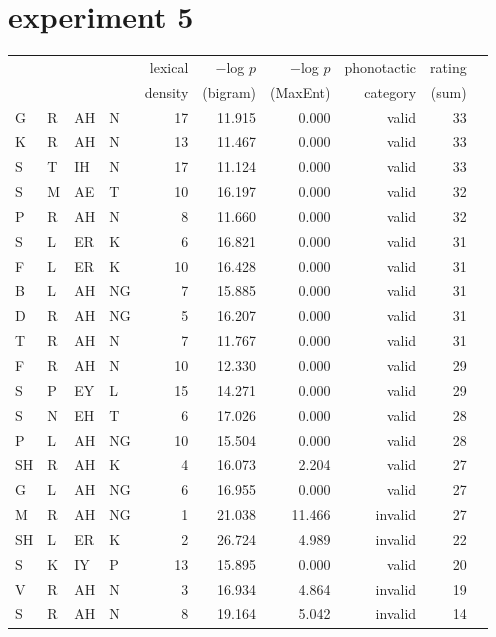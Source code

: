 \section{\citet{Scholes1966} experiment 5}    

\begin{longtable}{l@{ } l@{ } l@{ } l r r r r r r} 
\toprule
  &   &    &     & lexical & $-$log $p$ & $-$log $p$ & phonotactic & rating \\
&&&& density & (bigram) & (MaxEnt) & category & (sum) \\
\midrule 
G  & R  & AH & N  & 17 & 11.915 & 0.000  & valid   & 33 \\
K  & R  & AH & N  & 13 & 11.467 & 0.000  & valid   & 33 \\
S  & T  & IH & N  & 17 & 11.124 & 0.000  & valid   & 33 \\
S  & M  & AE & T  & 10 & 16.197 & 0.000  & valid   & 32 \\
P  & R  & AH & N  & 8  & 11.660 & 0.000  & valid   & 32 \\
S  & L  & ER & K  & 6  & 16.821 & 0.000  & valid   & 31 \\
F  & L  & ER & K  & 10 & 16.428 & 0.000  & valid   & 31 \\
B  & L  & AH & NG & 7  & 15.885 & 0.000  & valid   & 31 \\
D  & R  & AH & NG & 5  & 16.207 & 0.000  & valid   & 31 \\
T  & R  & AH & N  & 7  & 11.767 & 0.000  & valid   & 31 \\
F  & R  & AH & N  & 10 & 12.330 & 0.000  & valid   & 29 \\
S  & P  & EY & L  & 15 & 14.271 & 0.000  & valid   & 29 \\
S  & N  & EH & T  & 6  & 17.026 & 0.000  & valid   & 28 \\
P  & L  & AH & NG & 10 & 15.504 & 0.000  & valid   & 28 \\
SH & R  & AH & K  & 4  & 16.073 & 2.204  & valid   & 27 \\
G  & L  & AH & NG & 6  & 16.955 & 0.000  & valid   & 27 \\
M  & R  & AH & NG & 1  & 21.038 & 11.466 & invalid & 27 \\
SH & L  & ER & K  & 2  & 26.724 & 4.989  & invalid & 22 \\
S  & K  & IY & P  & 13 & 15.895 & 0.000  & valid   & 20 \\
V  & R  & AH & N  & 3  & 16.934 & 4.864  & invalid & 19 \\
S  & R  & AH & N  & 8  & 19.164 & 5.042  & invalid & 14 \\

\end{longtable}

